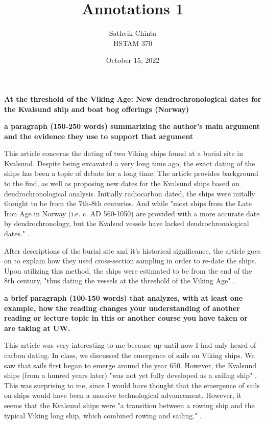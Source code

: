 \documentclass[a4paper]{article}
\title {
	Annotations 1
}
\author {
	\normalsize Sathvik Chinta\\\normalsize
    \normalsize HSTAM 370\\\normalsize
}
\date {
	\color{black} October 15, 2022
}
\begin{document}
 \maketitle
    \section{}
        \textbf{At the threshold of the Viking Age: New dendrochronological dates for the Kvalsund ship and boat bog offerings (Norway)}

        \textbf{a paragraph (150-250 words) summarizing the author's main argument and the evidence they use to support that argument}
        
        This article concerns the dating of two Viking ships found at a burial site in Kvalsund.
        Despite being excavated a very long time ago, the exact dating of the ships has been a topic of 
        debate for a long time. The article provides background to the find, as well as proposing new dates for the 
        Kvalsund ships based on dendrochronological analysis. Initially radiocarbon dated, the ships 
        were initally thought to be from the 7th-8th centuries. And while "most ships from the Late Iron 
        Age in Norway (i.e. c. AD 560-1050) are provided with a more accurate date by 
        dendrochronology, but the Kvalsud vessels have lacked dendrochronological dates." \citep{NORDEIDE2020102192}. 

        After descriptions of the burial site and it's historical significance, the article goes on to explain how they used 
        cross-section sampling in order to re-date the ships. Upon utilizing this method, the 
        ships were estimated to be from the end of the 8th century, "thus dating the vessels at the threshold of the Viking Age"
        \citep{NORDEIDE2020102192}.
        
        \textbf{a brief paragraph (100-150 words) that analyzes, with at least one example, how the reading changes your understanding of another reading or lecture topic in this or another course you have taken or are taking at UW.}
        
        This article was very interesting to me because up until now I had only heard of carbon dating. In class, we 
        discussed the emergence of sails on Viking ships. We saw that sails first began to emerge around the year
        650. However, the Kvalsund ships (from a hunred years later) "was not yet fully developed as a sailing ship" \citep{NORDEIDE2020102192}.
        This was surprising to me, since I would have thought that the emergence of sails on ships would have been a massive
        technological advancement. However, it seems that the Kvalsund ships were "a transition between a rowing ship and the typical Viking long ship, which combined rowing and sailing." \citep{NORDEIDE2020102192}.

        \pagebreak
        
        
        \cite{NORDEIDE2020102192}
\end{document}
